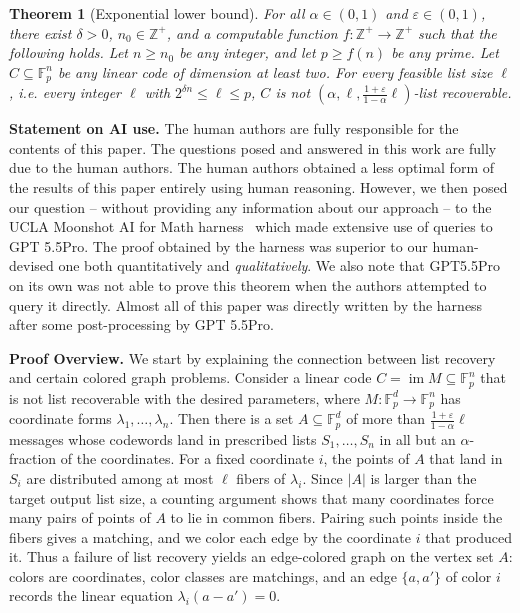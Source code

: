 \documentclass[10pt,a4paper]{amsart}
\newtheorem{theorem}{Theorem}
\newcommand{\Fp}{\mathbb{F}_p}
\begin{document}
\begin{theorem}[Exponential lower bound]\label{thm:lower}
    For all $\alpha \in (0,1)$ and $\varepsilon \in (0,1)$, there exist $\delta > 0$, $n_0 \in \mathbb{Z}^+$, and a computable function $f : \mathbb{Z}^+ \rightarrow \mathbb{Z}^+$ such that the following holds. Let $n \geq n_0$ be any integer, and let $p \geq f(n)$ be any prime. Let $C \subseteq \Fp^n$ be any linear code of dimension at least two. For every feasible list size $\ell$, i.e. every integer $\ell$ with $2^{\delta n}\le \ell\le p$, $C$ is not $(\alpha, \ell, \frac{1+\varepsilon}{1-\alpha}\ell)$-list recoverable.
\end{theorem}

\textbf{Statement on AI use.}
The human authors are fully responsible for the contents of this paper.
The questions posed and answered in this work are fully due to the human authors.
The human authors obtained a less optimal form of the results of this paper entirely using human reasoning. However, we then posed our question -- without providing any information about our approach -- to the UCLA Moonshot AI for Math harness~\cite{MoonshotHarness} which made extensive use of queries to GPT 5.5Pro. 
The proof obtained by the harness was superior to our human-devised one both quantitatively and \emph{qualitatively}. We also note that GPT5.5Pro on its own was not able to prove this theorem when the authors attempted to query it directly. Almost all of this paper was directly written by the harness after some post-processing by GPT 5.5Pro.

\textbf{Proof Overview.}
We start by explaining the connection between list recovery and certain colored graph problems. Consider a linear code $C=\operatorname{im}M\subseteq\Fp^n$ that is not list recoverable with the desired parameters, where $M:\Fp^d\to\Fp^n$ has coordinate forms $\lambda_1,\ldots,\lambda_n$. Then there is a set $A\subseteq\Fp^d$ of more than $\frac{1+\varepsilon}{1-\alpha}\ell$ messages whose codewords land in prescribed lists $S_1,\ldots,S_n$ in all but an $\alpha$-fraction of the coordinates. For a fixed coordinate $i$, the points of $A$ that land in $S_i$ are distributed among at most $\ell$ fibers of $\lambda_i$. Since $|A|$ is larger than the target output list size, a counting argument shows that many coordinates force many pairs of points of $A$ to lie in common fibers. Pairing such points inside the fibers gives a matching, and we color each edge by the coordinate $i$ that produced it. Thus a failure of list recovery yields an edge-colored graph on the vertex set $A$: colors are coordinates, color classes are matchings, and an edge $\{a,a'\}$ of color $i$ records the linear equation $\lambda_i(a-a')=0$.
\end{document}
